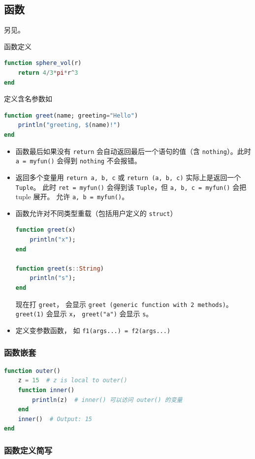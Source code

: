 \subsection{函数}

另见。

函数定义
\begin{lstlisting}[language=julia]
function sphere_vol(r)
    return 4/3*pi*r^3
end
\end{lstlisting}

定义含名参数如
\begin{lstlisting}[language=julia]
function greet(name; greeting="Hello")
    println("greeting, $(name)!")
end
\end{lstlisting}

\begin{itemize}
\item 函数最后如果没有 \verb`return` 会自动返回最后一个语句的值（含 \verb`nothing`）。此时 \verb`a = myfun()` 会得到 \verb`nothing` 不会报错。
\item 返回多个变量用 \verb`return a, b, c` 或 \verb`return (a, b, c)` 实际上是返回一个 \verb`Tuple`。 此时 \verb`ret = myfun()` 会得到该 \verb`Tuple`，但 \verb`a, b, c = myfun()` 会把 tuple 展开。 允许 \verb`a, b = myfun()`。
\item 函数允许对不同类型重载（包括用户定义的 \verb`struct`）
\begin{lstlisting}[language=julia]
function greet(x)
    println("x");
end

function greet(s::String)
    println("s");
end
\end{lstlisting}
现在打 \verb`greet`， 会显示 \verb`greet (generic function with 2 methods)`。 \verb`greet(1)` 会显示 \verb`x`， \verb`greet("a")` 会显示 \verb`s`。
\item 定义变参数函数， 如 \verb`f1(args...) = f2(args...)`
\end{itemize}

\subsubsection{函数嵌套}
\begin{lstlisting}[language=julia]
function outer()
    z = 15  # z is local to outer()
    function inner()
        println(z)  # inner() 可以访问 outer() 的变量
    end
    inner()  # Output: 15
end
\end{lstlisting}

\subsubsection{函数定义简写}

